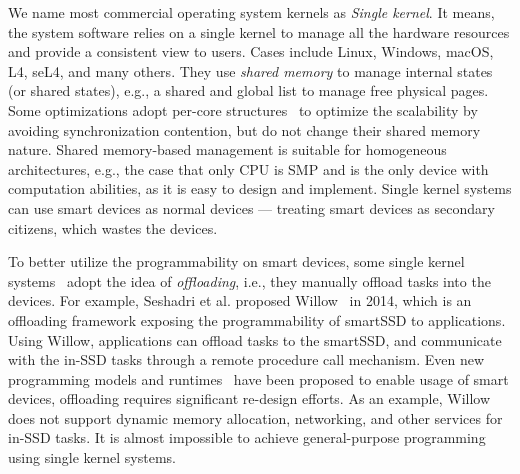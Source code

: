 %
%
%
%
%
%
%
%
%
%
%
%
%
%
%
%
%
%
%
%
%
%
%
%
%
%
%
%
%
%
%
%
%
%
%
%
%
%
%

\iffalse
{}
We name most commercial operating system kernels as \emph{Single kernel}.
It means, the system software relies on a single kernel to manage all the hardware resources and provide a consistent view to users.
Cases include Linux, Windows, macOS, L4, seL4, and many others.
They use \emph{shared memory} to manage internal states (or shared states), e.g., a shared and global list to manage free physical pages.
Some optimizations adopt per-core structures~\cite{veal2007performance, gough2007kernel, boyd2010analysis} to optimize the scalability by avoiding synchronization contention, but do not change their shared memory nature.
Shared memory-based management is suitable for homogeneous architectures, e.g., the case that only CPU is SMP and is the only device with computation abilities, as it is easy to design and implement.
Single kernel systems can use smart devices as normal devices --- treating smart devices as secondary citizens, which wastes the devices.

To better utilize the programmability on smart devices, some single kernel systems~\cite{phothilimthana2018floem, seshadri2014willow, gu2016biscuit} adopt the idea of \emph{offloading}, i.e., they manually offload tasks into the devices.
For example, Seshadri et al. proposed Willow~\cite{seshadri2014willow} in 2014, which is an offloading framework exposing the programmability of smartSSD to applications.
Using Willow, applications can offload tasks to the smartSSD, and communicate with the in-SSD tasks through a remote procedure call mechanism.
Even new programming models\cite{phothilimthana2018floem} and runtimes~\cite{seshadri2014willow, gu2016biscuit, kim2014gpunet, silberstein2013gpufs} have been proposed to enable usage of smart devices, %
offloading requires significant re-design efforts.
As an example, Willow does not support dynamic memory allocation, networking, and other services for in-SSD tasks.
It is almost impossible to achieve general-purpose programming using single kernel systems.

